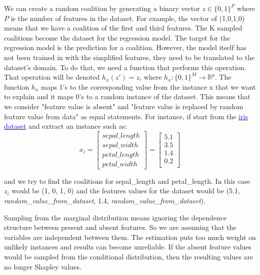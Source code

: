 We can create a random coalition by generating a binary vector $z \in \{0, 1\}^P$ where $P$ is the number of features in the dataset. 
For example, the vector of (1,0,1,0) means that we have a coalition of the first and third features. 
The K sampled coalitions become the dataset for the regression model. 
The target for the regression model is the prediction for a coalition. 
However, the model itself has not been trained in with the simplified features, they need to be translated to the dataset's domain.
To do that, we need a function that performs this operation. That operation will be denoted $h_x(z')=z$, where $h_x:\{0,1\}^M\rightarrow\mathbb{R}^p$.
\newline
\newline
The function $h_x$ maps 1's to the corresponding value from the instance x that we want to explain and it maps 0's to a random instance of the dataset.
This means that we consider "feature value is absent" and "feature value is replaced by random feature value from data" as equal statements.
For instance, if start from the \href{https://archive.ics.uci.edu/ml/datasets/iris}{\textcolor{blue}{iris dataset}} and extract an instance such as:
\[
x_i=
  \begin{bmatrix}
    sepal\_length \\
    sepal\_width \\
    petal\_length \\
    petal\_width
  \end{bmatrix}
  =
  \begin{bmatrix}
    5.1 \\
    3.5 \\
    1.4 \\
    0.2 \\
  \end{bmatrix}
\]

and we try to find the coalitions for sepal\_length and petal\_length. In this case $z_i$ would be (1, 0, 1, 0) and the features values for the dataset would be (5.1, \textit{random\_value\_from\_dataset}, 1.4, \textit{random\_value\_from\_dataset}).

Sampling from the marginal distribution means ignoring the dependence structure between present and absent features. So we are assuming that the variables are independent between them.
The estimation puts too much weight on unlikely instances and results can become unreliable.
If the absent feature values would be sampled from the conditional distribution, then the resulting values are no longer Shapley values.


